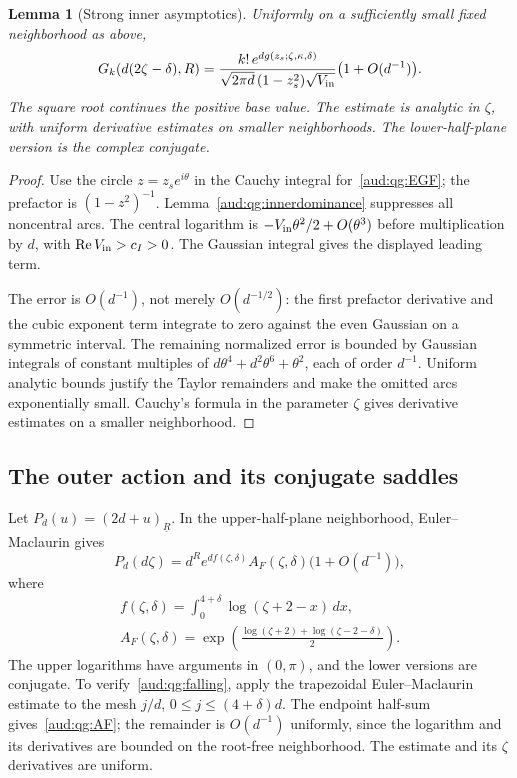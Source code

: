\documentclass[11pt,a4paper]{article}
\numberwithin{equation}{section}
\newtheorem{lemma}[theorem]{Lemma}
\newcommand{\fall}[2]{(#1)_{\underline{#2}}}
\begin{document}
\begin{lemma}[Strong inner asymptotics]\label{aud:qg:innerstrong}
Uniformly on a sufficiently small fixed neighborhood as above,
\begin{equation}\label{aud:qg:innerformula}
 G_k(d(2\zeta-\delta),R)
 =\frac{k!\,e^{d g(z_s;\zeta,\kappa,\delta)}}
 {\sqrt{2\pi d}\,(1-z_s^2)\sqrt{V_{\rm in}}}
 \bigl(1+O(d^{-1})\bigr).
\end{equation}
The square root continues the positive base value. The estimate is analytic in $\zeta$, with uniform derivative estimates on smaller neighborhoods. The lower-half-plane version is the complex conjugate.
\end{lemma}
\begin{proof}
Use the circle $z=z_se^{i\theta}$ in the Cauchy integral for~\eqref{aud:qg:EGF}; the prefactor is $(1-z^2)^{-1}$. Lemma~\ref{aud:qg:innerdominance} suppresses all noncentral arcs. The central logarithm is
$-V_{\rm in}\theta^2/2+O(\theta^3)$ before multiplication by $d$, with $\operatorname{Re}V_{\rm in}>c_I>0$. The Gaussian integral gives the displayed leading term.

The error is $O(d^{-1})$, not merely $O(d^{-1/2})$: the first prefactor derivative and the cubic exponent term integrate to zero against the even Gaussian on a symmetric interval. The remaining normalized error is bounded by Gaussian integrals of constant multiples of $d\theta^4+d^2\theta^6+\theta^2$, each of order $d^{-1}$. Uniform analytic bounds justify the Taylor remainders and make the omitted arcs exponentially small. Cauchy's formula in the parameter $\zeta$ gives derivative estimates on a smaller neighborhood.
\end{proof}

\subsection{The outer action and its conjugate saddles}
Let $P_d(u)=\fall{2d+u}{R}$. In the upper-half-plane neighborhood, Euler--Maclaurin gives
\begin{equation}\label{aud:qg:falling}
 P_d(d\zeta)=d^R e^{d f(\zeta,\delta)}A_F(\zeta,\delta)
 \bigl(1+O(d^{-1})\bigr),
\end{equation}
where
\begin{gather}
 f(\zeta,\delta)=\int_0^{4+\delta}\log(\zeta+2-x)\,dx,\label{aud:qg:f}\\
 A_F(\zeta,\delta)=
 \exp\left(\frac{\log(\zeta+2)+\log(\zeta-2-\delta)}2\right).
 \label{aud:qg:AF}
\end{gather}
The upper logarithms have arguments in $(0,\pi)$, and the lower versions are conjugate. To verify~\eqref{aud:qg:falling}, apply the trapezoidal Euler--Maclaurin estimate to the mesh $j/d$, $0\le j\le(4+\delta)d$. The endpoint half-sum gives~\eqref{aud:qg:AF}; the remainder is $O(d^{-1})$ uniformly, since the logarithm and its derivatives are bounded on the root-free neighborhood. The estimate and its $\zeta$ derivatives are uniform.
\end{document}
